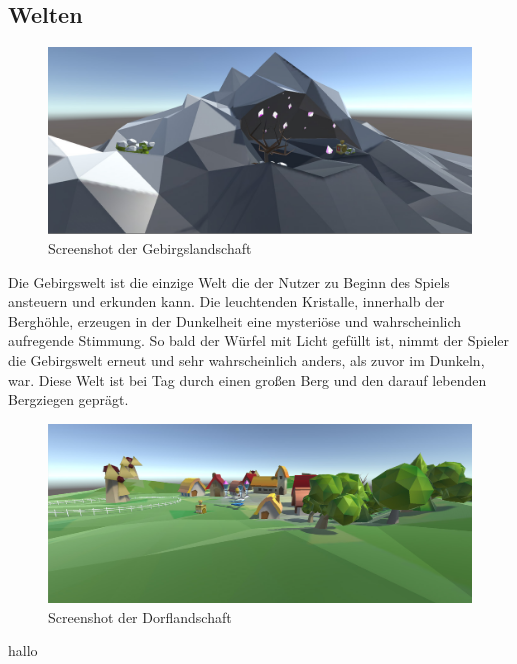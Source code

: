 \subsection{Welten}

\begin{figure}[!htbp]%
	\centering
		\includegraphics[width=1.0\textwidth]{images/Gebirge}
	\caption{Screenshot der Gebirgslandschaft}
	\label{fig:Gebirge}
\end{figure}

Die Gebirgswelt ist die einzige Welt die der Nutzer zu Beginn des Spiels ansteuern und erkunden kann. Die leuchtenden Kristalle, innerhalb der Berghöhle, erzeugen in der Dunkelheit eine mysteriöse und wahrscheinlich aufregende Stimmung. So bald der Würfel mit Licht gefüllt ist, nimmt der Spieler die Gebirgswelt erneut und sehr wahrscheinlich anders, als zuvor im Dunkeln, war. Diese Welt ist bei Tag durch einen großen Berg und den darauf lebenden Bergziegen geprägt.


\begin{figure}[!htbp]%
	\centering
		\includegraphics[width=1.0\textwidth]{images/Dorf}
	\caption{Screenshot der Dorflandschaft}
	\label{fig:Dorf}
\end{figure}

hallo

